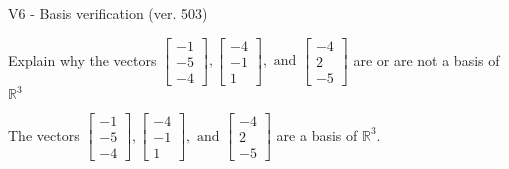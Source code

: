 \begin{exercise}
  \begin{exerciseTitle}V6 - Basis verification (ver. 503)\end{exerciseTitle}
  \begin{exerciseStatement}
    Explain why the vectors \(\left[\begin{array}{r}
-1 \\
-5 \\
-4
\end{array}\right] , \left[\begin{array}{r}
-4 \\
-1 \\
1
\end{array}\right] , \text{ and } \left[\begin{array}{r}
-4 \\
2 \\
-5
\end{array}\right]\) are or are not a basis of \(\mathbb{R}^3\)	


  \end{exerciseStatement}
  \begin{exerciseAnswer}
   The vectors \(\left[\begin{array}{r}
-1 \\
-5 \\
-4
\end{array}\right] , \left[\begin{array}{r}
-4 \\
-1 \\
1
\end{array}\right] , \text{ and } \left[\begin{array}{r}
-4 \\
2 \\
-5
\end{array}\right]\) 
  	 are  a basis of \(\mathbb{R}^3\).
  


  \end{exerciseAnswer}
\end{exercise}